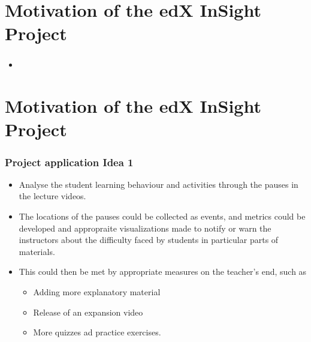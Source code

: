 \documentclass[12pt,xcolor=dvipsnames]{beamer}
\begin{document}
\section{Motivation of the edX InSight Project}
\begin{frame}[t]
\frametitle{}

\begin{itemize}
\item 
\end{itemize}
\end{frame}

\section{Motivation of the edX InSight Project}
\begin{frame}[t]
\frametitle{Project application Idea 1}

\begin{itemize}
\item Analyse the student learning behaviour and activities through the pauses in the lecture videos.
\item The locations of the pauses could be collected as events, and metrics could be developed and appropraite visualizations made to notify or warn the instructors about the difficulty faced by students in particular parts of materials.
\item This could then be met by appropriate measures on the teacher's end, such as

\begin{itemize}
\item Adding more explanatory material
\item Release of an expansion video
\item More quizzes ad practice exercises.
\end{itemize}

\end{itemize}
\end{frame}

\end{document}
